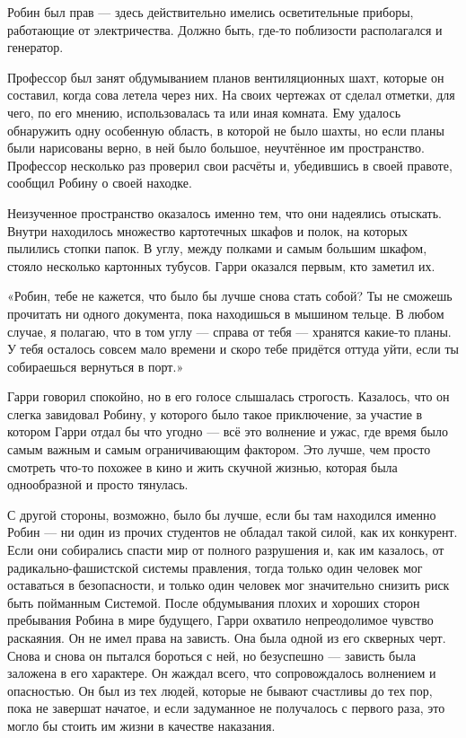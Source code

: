 \documentclass[a4paper,12pt]{book}
\begin{document}
\par
Робин был прав — здесь действительно имелись осветительные приборы, работающие от электричества. Должно быть, где-то поблизости располагался и генератор.\\
\par
Профессор был занят обдумыванием планов вентиляционных шахт, которые он составил, когда сова летела через них. На своих чертежах от сделал отметки, для чего, по его мнению, использовалась та или иная комната. Ему удалось обнаружить одну особенную область, в которой не было шахты, но если планы были нарисованы верно, в ней было большое, неучтённое им пространство. Профессор несколько раз проверил свои расчёты и, убедившись в своей правоте, сообщил Робину о своей находке.\\
\par
Неизученное пространство оказалось именно тем, что они надеялись отыскать. Внутри находилось множество картотечных шкафов и полок, на которых пылились стопки папок. В углу, между полками и самым большим шкафом, стояло несколько картонных тубусов. Гарри оказался первым, кто заметил их.
\par
«Робин, тебе не кажется, что было бы лучше снова стать собой? Ты не сможешь прочитать ни одного документа, пока находишься в мышином тельце. В любом случае, я полагаю, что в том углу — справа от тебя — хранятся какие-то планы. У тебя осталось совсем мало времени и скоро тебе придётся оттуда уйти, если ты собираешься вернуться в порт.»
\par
Гарри говорил спокойно, но в его голосе слышалась строгость. Казалось, что он слегка завидовал Робину, у которого было такое приключение, за участие в котором Гарри отдал бы что угодно — всё это волнение и ужас, где время было самым важным и самым ограничивающим фактором. Это лучше, чем просто смотреть что-то похожее в кино и жить скучной жизнью, которая была однообразной и просто тянулась.
\par
С другой стороны, возможно, было бы лучше, если бы там находился именно Робин — ни один из прочих студентов не обладал такой силой, как их конкурент. Если они собирались спасти мир от полного разрушения и, как им казалось, от радикально-фашистской системы правления, тогда только один человек мог оставаться в безопасности, и только один человек мог значительно снизить риск быть пойманным Системой. После обдумывания плохих и хороших сторон пребывания Робина в мире будущего, Гарри охватило непреодолимое чувство раскаяния. Он не имел права на зависть. Она была одной из его скверных черт. Снова и снова он пытался бороться с ней, но безуспешно — зависть была заложена в его характере. Он жаждал всего, что сопровождалось волнением и опасностью. Он был из тех людей, которые не бывают счастливы до тех пор, пока не завершат начатое, и если задуманное не получалось с первого раза, это могло бы стоить им жизни в качестве наказания.
\end{document}
